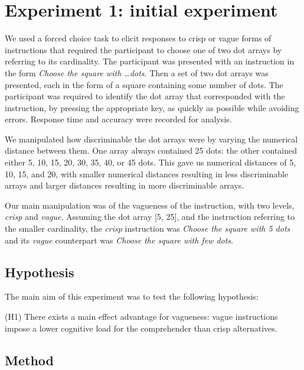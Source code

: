 \documentclass[%
man,		%
floatsintext,%
apacite%
]{apa6}
\begin{document}
\section{Experiment 1: initial experiment} 

We used a forced choice task to elicit responses to crisp or vague forms of instructions that required the participant to choose one of two dot arrays by referring to its cardinality. The participant was presented with an instruction in the form \emph{Choose the square with \ldots dots}. Then a set of two dot arrays was presented, each in the form of a square containing some number of dots. 
The participant was required to identify the dot array that corresponded with the instruction, by pressing the appropriate key, as quickly as possible while avoiding errors. 
Response time and accuracy were recorded for analysis. 

We manipulated how discriminable the dot arrays were by varying the numerical distance between them. 
One array always contained 25 dots: the other contained either 5, 10, 15, 20, 30, 35, 40, or 45 dots. 
This gave us numerical distances of 5, 10, 15, and 20, with smaller numerical distances resulting in less discriminable arrays and larger distances resulting in more discriminable arrays. 

Our main manipulation was of the vagueness of the instruction, with two levels, \emph{crisp} and \emph{vague}.
Assuming the dot array [5, 25], and the instruction referring to the smaller cardinality, the \emph{crisp} instruction was \emph{Choose the square with 5 dots} and its \emph{vague} counterpart was \emph{Choose the square with few dots}. 

\subsection{Hypothesis}
\noindent The main aim of this experiment was to test the following hypothesis:
{\small
\begin{APAenumerate}
	\item [(H1)] There exists a main effect advantage for vagueness: vague instructions impose a lower cognitive load for the comprehender than crisp alternatives.
\end{APAenumerate}
}

\subsection{Method}
\end{document}

